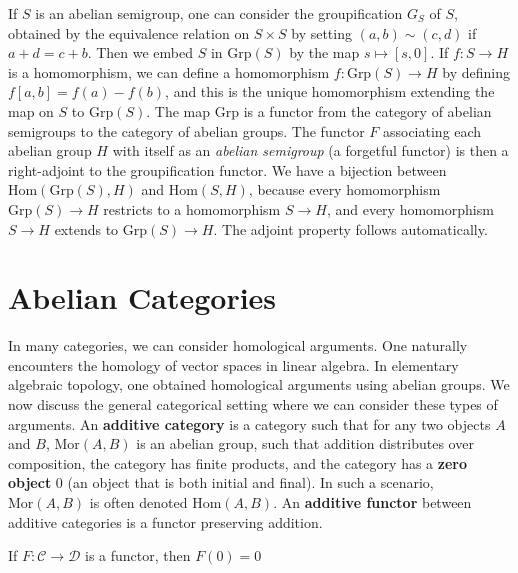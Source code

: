 \begin{example}
    If $S$ is an abelian semigroup, one can consider the groupification $G_S$ of $S$, obtained by the equivalence relation on $S \times S$ by setting $(a,b) \sim (c,d)$ if $a + d = c + b$. Then we embed $S$ in $\text{Grp}(S)$ by the map $s \mapsto [s,0]$. If $f: S \to H$ is a homomorphism, we can define a homomorphism $f: \text{Grp}(S) \to H$ by defining $f[a,b] = f(a) - f(b)$, and this is the unique homomorphism extending the map on $S$ to $\text{Grp}(S)$. The map $\text{Grp}$ is a functor from the category of abelian semigroups to the category of abelian groups. The functor $F$ associating each abelian group $H$ with itself as an {\it abelian semigroup} (a forgetful functor) is then a right-adjoint to the groupification functor. We have a bijection between $\text{Hom}(\text{Grp}(S),H)$ and $\text{Hom}(S,H)$, because every homomorphism $\text{Grp}(S) \to H$ restricts to a homomorphism $S \to H$, and every homomorphism $S \to H$ extends to $\text{Grp}(S) \to H$. The adjoint property follows automatically.
\end{example}

\chapter{Abelian Categories}

In many categories, we can consider homological arguments. One naturally encounters the homology of vector spaces in linear algebra. In elementary algebraic topology, one obtained homological arguments using abelian groups. We now discuss the general categorical setting where we can consider these types of arguments. An {\bf additive category} is a category such that for any two objects $A$ and $B$, $\text{Mor}(A,B)$ is an abelian group, such that addition distributes over composition, the category has finite products, and the category has a {\bf zero object} $0$ (an object that is both initial and final). In such a scenario, $\text{Mor}(A,B)$ is often denoted $\text{Hom}(A,B)$. An {\bf additive functor} between additive categories is a functor preserving addition.

\begin{theorem}
    If $F: \mathcal{C} \to \mathcal{D}$ is a functor, then $F(0) = 0$
\end{theorem}

